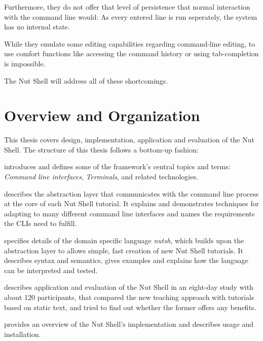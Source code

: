 \documentclass[paper=a4,twoside,abstract=on,cleardoublepage=empty,numbers=noenddot,toc=bib,12pt,appendixprefix=true]{scrreprt}
\begin{document}
Furthermore, they do not offer that level of persistence that normal interaction with the command line would: As every entered line is run seperately, the system has no internal state.

While they emulate some editing capabilities regarding command-line editing, to use comfort functions like accessing the command history or using tab-completion is impossible.

The Nut Shell will address all of these shortcomings.

\section{Overview and Organization}



This thesis covers design, implementation, application and evaluation of the Nut Shell. The structure of this thesis follows a bottom-up fashion:

 introduces and defines some of the framework's central topics and terms: \emph{Command line interfaces}, \emph{Terminals}, and related technologies.

 describes the abstraction layer that communicates with the command line process at the core of each Nut Shell tutorial. It explains and demonstrates techniques for adapting to many different command line interfaces and names the requirements the CLIs need to fulfill.

 specifies details of the domain specific language \emph{nutsh}, which builds upon the abstraction layer to allows simple, fast creation of new Nut Shell tutorials. It describes syntax and semantics, gives examples and explains how the language can be interpreted and tested.

 describes application and evaluation of the Nut Shell in an eight-day study with about 120 participants, that compared the new teaching approach with tutorials based on static text, and tried to find out whether the former offers any benefits.

 provides an overview of the Nut Shell's implementation and describes usage and installation.
\end{document}
